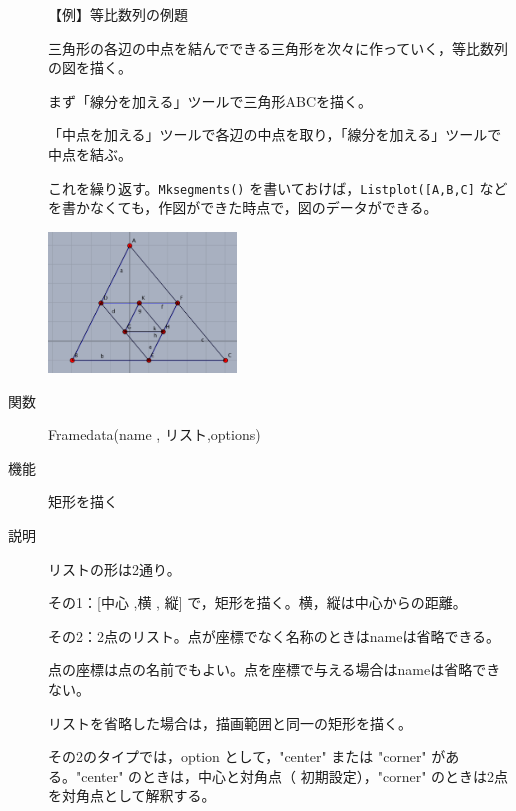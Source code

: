 \documentclass[papersize,a4paper,12pt,uplatex]{jsarticle}
\begin{document}
\begin{description}
\vspace{\baselineskip}
【例】等比数列の例題

三角形の各辺の中点を結んでできる三角形を次々に作っていく，等比数列の図を描く。

まず「線分を加える」ツールで三角形ABCを描く。

「中点を加える」ツールで各辺の中点を取り，「線分を加える」ツールで中点を結ぶ。

これを繰り返す。\verb|Mksegments()| を書いておけば，\verb|Listplot([A,B,C]| などを書かなくても，作図ができた時点で，図のデータができる。

\includegraphics[bb=0.00 0.00 438.02 327.02,width=5cm]{Fig/gpro01.pdf}     

\vspace{\baselineskip}
\hypertarget{framedata}{}
\item[関数]  Framedata(name , リスト,options)
\item[機能]  矩形を描く
\item[説明]  リストの形は2通り。

その1：[中心 ,横 , 縦] で，矩形を描く。横，縦は中心からの距離。

その2：2点のリスト。点が座標でなく名称のときはnameは省略できる。

点の座標は点の名前でもよい。点を座標で与える場合はnameは省略できない。

リストを省略した場合は，描画範囲と同一の矩形を描く。

その2のタイプでは，option として，"center" または "corner" がある。"center" のときは，中心と対角点（ 初期設定），"corner" のときは2点を対角点として解釈する。 


\end{description}
\end{document}
